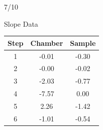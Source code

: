 \documentclass[UTF8,10pt,a4paper,fontset=fandol]{ctexart}
\newcommand{\fieldvalue}[1]{#1}
\newcommand{\handwritten}[1]{#1}
\begin{document}
\medskip
\noindent
\handwritten{7/10}

\newpage

\begin{center}
\end{center}

\vspace{1em}

\noindent
\begin{minipage}[t]{0.36\linewidth}
\centering
Slope Data

\vspace{0.3em}
\begin{tabular}{c c c}
\hline
Step & Chamber & Sample \\
\hline
\fieldvalue{1} &
\fieldvalue{-0.01} &
\fieldvalue{-0.30} \\

\fieldvalue{2} &
\fieldvalue{-0.00} &
\fieldvalue{-0.02} \\

\fieldvalue{3} &
\fieldvalue{-2.03} &
\fieldvalue{-0.77} \\

\fieldvalue{4} &
\fieldvalue{-7.57} &
\fieldvalue{0.00} \\

\fieldvalue{5} &
\fieldvalue{2.26} &
\fieldvalue{-1.42} \\

\fieldvalue{6} &
\fieldvalue{-1.01} &
\fieldvalue{-0.54} \\


\end{tabular}
\end{minipage}
\end{document}
